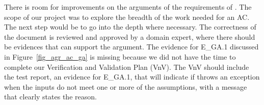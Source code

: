 There is room for improvements on the arguments of the requirements of \progname{}. The scope of our project was to explore the breadth of the work needed for an AC. The next step would be to go into the depth where necessary. The correctness of the document is reviewed and approved by a domain expert, where there should be evidences that can support the argument. The evidence for  E\_GA.1 discussed in Figure~\ref{fig_agr_ac_ga} is missing because we did not have the time to complete our Verification and Validation Plan (VnV). The VnV should include the test report, an evidence for E\_GA.1, that will indicate if \progname{} throws an exception when the inputs do not meet one or more of the assumptions, with a message that clearly states the reason.